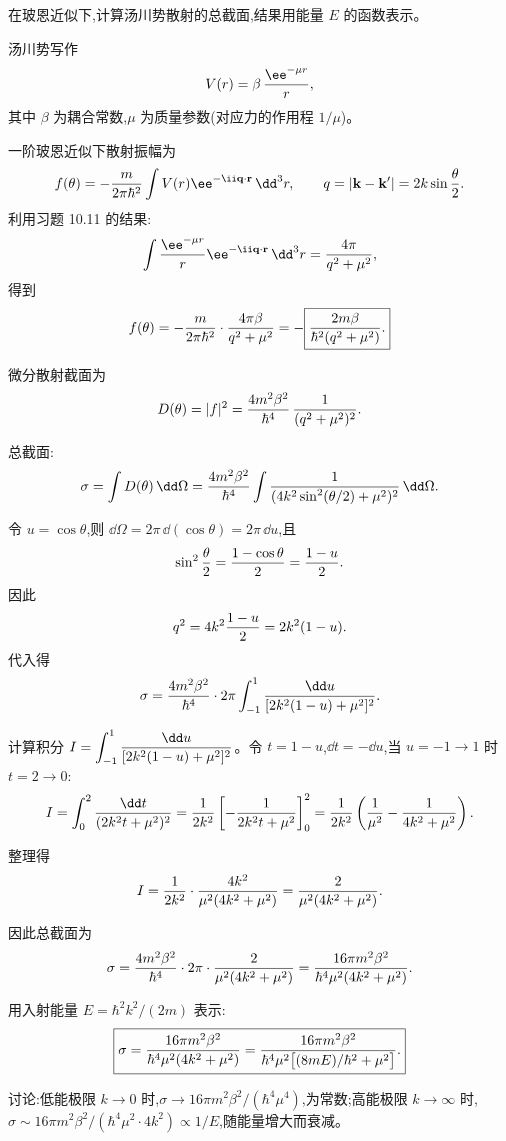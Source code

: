 \begin{question}
在玻恩近似下,计算汤川势散射的总截面,结果用能量 $E$ 的函数表示。
\begin{solution}
汤川势写作
\[
V(r)=\beta\,{\ee^{-\mu r}\over r},
\]
其中 $\beta$ 为耦合常数,$\mu$ 为质量参数(对应力的作用程 $1/\mu$)。

一阶玻恩近似下散射振幅为
\[
f(\theta)=-{m\over2\pi\hbar^2}\int V(r)\ee^{-\ii\mathbf q\cdot\mathbf r}\,\dd^3r,
\qquad q=|\mathbf k-\mathbf k'|=2k\sin{\theta\over2}.
\]
利用习题 10.11 的结果:
\[
\int {\ee^{-\mu r}\over r}\ee^{-\ii\mathbf q\cdot\mathbf r}\,\dd^3r={4\pi\over q^2+\mu^2},
\]
得到
\[
f(\theta)=-{m\over2\pi\hbar^2}\cdot{4\pi\beta\over q^2+\mu^2}
=-\boxed{{2m\beta\over\hbar^2(q^2+\mu^2)}.}
\]

微分散射截面为
\[
D(\theta)=|f|^2={4m^2\beta^2\over\hbar^4}\,{1\over(q^2+\mu^2)^2}.
\]

总截面:
\[
\sigma=\int D(\theta)\,\dd\Omega
={4m^2\beta^2\over\hbar^4}\int{1\over(4k^2\sin^2(\theta/2)+\mu^2)^2}\,\dd\Omega.
\]

令 $u=\cos\theta$,则 $\dd\Omega=2\pi\,\dd(\cos\theta)=2\pi\,\dd u$,且
\[
\sin^2{\theta\over2}={1-\cos\theta\over2}={1-u\over2}.
\]
因此
\[
q^2=4k^2{1-u\over2}=2k^2(1-u).
\]
代入得
\[
\sigma={4m^2\beta^2\over\hbar^4}\cdot2\pi\int_{-1}^{1}{\dd u\over[2k^2(1-u)+\mu^2]^2}.
\]

计算积分 $\displaystyle I=\int_{-1}^{1}{\dd u\over[2k^2(1-u)+\mu^2]^2}$。令 $t=1-u$,$\dd t=-\dd u$,当 $u=-1\to1$ 时 $t=2\to0$:
\[
I=\int_{0}^{2}{\dd t\over(2k^2t+\mu^2)^2}
={1\over2k^2}\left[-{1\over2k^2t+\mu^2}\right]_{0}^{2}
={1\over2k^2}\left({1\over\mu^2}-{1\over4k^2+\mu^2}\right).
\]

整理得
\[
I={1\over2k^2}\cdot{4k^2\over\mu^2(4k^2+\mu^2)}
={2\over\mu^2(4k^2+\mu^2)}.
\]

因此总截面为
\[
\sigma={4m^2\beta^2\over\hbar^4}\cdot2\pi\cdot{2\over\mu^2(4k^2+\mu^2)}
={16\pi m^2\beta^2\over\hbar^4\mu^2(4k^2+\mu^2)}.
\]

用入射能量 $E=\hbar^2k^2/(2m)$ 表示:
\[
\boxed{\sigma={16\pi m^2\beta^2\over\hbar^4\mu^2(4k^2+\mu^2)}
={16\pi m^2\beta^2\over\hbar^4\mu^2\bigl[(8mE)/\hbar^2+\mu^2\bigr]}.}
\]

讨论:低能极限 $k\to0$ 时,$\sigma\to 16\pi m^2\beta^2/(\hbar^4\mu^4)$,为常数;高能极限 $k\to\infty$ 时,$\sigma\sim16\pi m^2\beta^2/(\hbar^4\mu^2\cdot4k^2)\propto 1/E$,随能量增大而衰减。
\end{solution}
\end{question}


